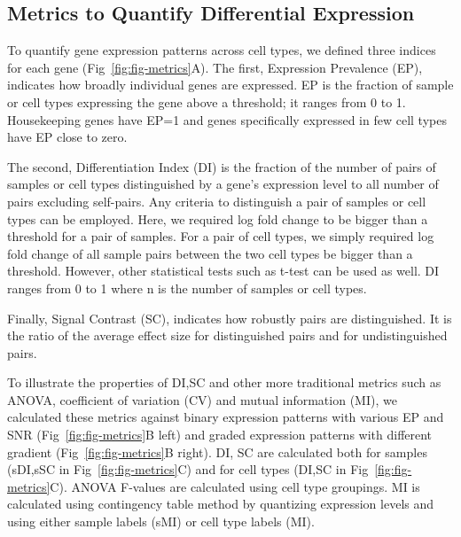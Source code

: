 \subsection{Metrics to Quantify Differential Expression}

To quantify gene expression patterns across cell types, we defined three indices for each gene (Fig~\ref{fig:fig-metrics}A). The first, Expression Prevalence (EP), indicates how broadly individual genes are expressed. EP is the fraction of sample or cell types expressing the gene above a threshold; it ranges from 0 to 1. Housekeeping genes have EP=1 and genes specifically expressed in few cell types have EP close to zero.

The second, Differentiation Index (DI) is the fraction of the number of pairs of samples or cell types distinguished by a gene's expression level to all number of pairs excluding self-pairs. Any criteria to distinguish a pair of samples or cell types can be employed. Here, we required log fold change to be bigger than a threshold for a pair of samples. For a pair of cell types, we simply required log fold change of all sample pairs between the two cell types be bigger than a threshold. However, other statistical tests such as t-test can be used as well. DI ranges from 0 to 1 where n is the number of samples or cell types. 

Finally, Signal Contrast (SC), indicates how robustly pairs are distinguished. It is the ratio of the average effect size for distinguished pairs and for undistinguished pairs. 

To illustrate the properties of DI,SC and other more traditional metrics such as ANOVA, coefficient of variation (CV) and mutual information (MI), we calculated these metrics against binary expression patterns with various EP and SNR (Fig~\ref{fig:fig-metrics}B left) and graded expression patterns with different gradient (Fig~\ref{fig:fig-metrics}B right). DI, SC are calculated both for samples (sDI,sSC in Fig~\ref{fig:fig-metrics}C) and for cell types (DI,SC in Fig~\ref{fig:fig-metrics}C). ANOVA F-values are calculated using cell type groupings. MI is calculated using contingency table method by quantizing expression levels and using either sample labels (sMI) or cell type labels (MI). 
% 
% 

